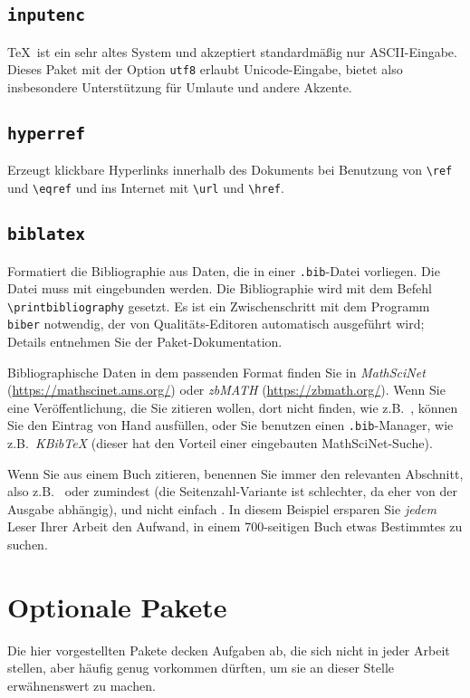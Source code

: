 \documentclass[11pt, a4paper, german]{article}
\theoremstyle{plain}
\theoremstyle{remark}
\theoremstyle{definition}
\numberwithin{equation}{section}
\numberwithin{theorem}{section}
\begin{document}
\subsection{\texttt{inputenc}}
\TeX\ ist ein sehr altes System und akzeptiert standardmäßig nur ASCII-Eingabe.
Dieses Paket mit der Option \verb|utf8| erlaubt Unicode-Eingabe, bietet also insbesondere Unterstützung für Umlaute und andere Akzente.

\subsection{\texttt{hyperref}}
Erzeugt klickbare Hyperlinks innerhalb des Dokuments bei Benutzung von \verb|\ref| und  \verb|\eqref| und ins Internet mit \verb|\url| und \verb|\href|.

\subsection{\texttt{biblatex}}
Formatiert die Bibliographie aus Daten, die in einer \verb|.bib|-Datei vorliegen.
Die Datei muss mit \verb|| eingebunden werden.
Die Bibliographie wird mit dem Befehl \verb|\printbibliography| gesetzt.
Es ist ein Zwischenschritt mit dem Programm \verb|biber| notwendig, der von Qualitäts-Editoren automatisch ausgeführt wird; Details entnehmen Sie der Paket-Dokumentation.

Bibliographische Daten in dem passenden Format finden Sie in \emph{Math\-Sci\-Net} (\url{https://mathscinet.ams.org/}) oder \emph{zbMATH} (\url{https://zbmath.org/}).
Wenn Sie eine Veröffentlichung, die Sie zitieren wollen, dort nicht finden, wie z.B.\ \cite{arxiv:1507.02515}, können Sie den Eintrag von Hand ausfüllen, oder Sie benutzen einen \verb|.bib|-Manager, wie z.B.\ \emph{KBibTeX} (dieser hat den Vorteil einer eingebauten MathSciNet-Suche).

Wenn Sie aus einem Buch zitieren, benennen Sie immer den relevanten Abschnitt, also z.B.\ \cite[Satz III.2.2]{MR1232192} oder zumindest \cite[p.\ 107]{MR1232192} (die Seitenzahl-Variante ist schlechter, da eher von der Ausgabe abhängig), und nicht einfach \cite{MR1232192}.
In diesem Beispiel ersparen Sie \emph{jedem} Leser Ihrer Arbeit den Aufwand, in einem 700-seitigen Buch etwas Bestimmtes zu suchen.

\clearpage
\section{Optionale Pakete}
Die hier vorgestellten Pakete decken Aufgaben ab, die sich nicht in jeder Arbeit stellen, aber häufig genug vorkommen dürften, um sie an dieser Stelle erwähnenswert zu machen.
\end{document}
